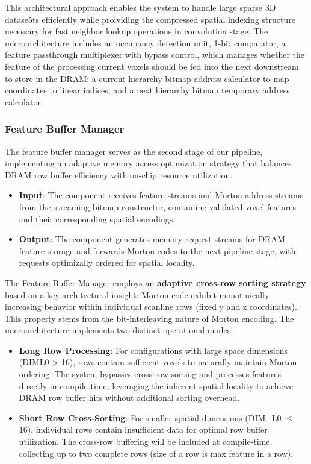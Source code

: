\documentclass[sigconf, screen]{acmart}
\begin{document}
This architectural approach enables the system to handle large sparse 3D datase5ts efficiently while proividing the compressed spatial indexing structure necessary for fast neighbor lookup operations in convolution stage. The microarchitecture includes an occupancy detection unit, 1-bit comparator; a feature passthrough multiplexer with bypass control, which manages whether the feature of the processing current voxels should be fed into the next downstream to store in the DRAM; a current hierarchy bitmap address calculator to map coordinates to linear indices; and a next hierarchy bitmap temporary address calculator.

\subsubsection{Feature Buffer Manager}
The feature buffer manager serves as the second stage of our pipeline, implementing an adaptive memory access optimization strategy that balances DRAM row buffer efficiency with on-chip resource utilization.
\begin{itemize}
    \item \textbf{Input}: The component receives feature streams and Morton address streams from the streaming bitmap constructor, containing validated voxel features and their corresponding spatial encodings.
    \item \textbf{Output}: The component generates memory request streams for DRAM feature storage and forwards Morton codes to the next pipeline stage, with requests optimizally ordered for spatial locality.
\end{itemize}
The Feature Buffer Manager employs an \textbf{adaptive cross-row sorting strategy} based on a key architectural insight: Morton code exhibit monotinically increasing behavior within individual scanline rows (fixed y and z coordinates). This property stems from the bit-interleaving nature of Morton encoding.
The microarchitecture implements two distinct operational modes:
 \begin{itemize}
      \item \textbf{Long Row Processing}: For configurations with large space dimensions (DIML0 > 16), rows contain sufficient voxels to naturally maintain Morton ordering. The system bypasses cross-row sorting and processes features directly in compile-time, leveraging the inherent spatial locality to achieve DRAM row buffer hits without additional sorting overhead.
      \item \textbf{Short Row Cross-Sorting}: For smaller spatial dimensions (DIM\_L0 $\leq$ 16), individual rows contain insufficient data for optimal row buffer utilization. The cross-row buffering will be included at compile-time, collecting up to two complete rows (size of a row is max feature in a row).
  \end{itemize}
\end{document}
